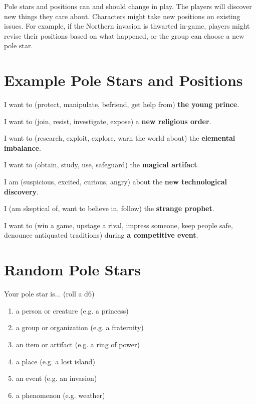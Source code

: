 \documentclass[10pt,oneside,letterpaper,landscape]{memoir}
\begin{document}
\begin{multicols}{3}
Pole stars and positions can and should change in play. The players will discover new things they care about. Characters might take new positions on existing issues. For example, if the Northern invasion is thwarted in-game, players might revise their positions based on what happened, or the group can choose a new pole star.

\vfill\null %

\columnbreak

\section{Example Pole Stars and Positions}

I want to (protect, manipulate, befriend, get help from) \textbf{the young prince}.

I want to (join, resist, investigate, expose) a \textbf{new religious order}.

I want to (research, exploit, explore, warn the world about) the \textbf{elemental imbalance}.

I want to (obtain, study, use, safeguard) the \textbf{magical artifact}.

I am (suspicious, excited, curious, angry) about the \textbf{new technological discovery}.

I (am skeptical of, want to believe in, follow) the \textbf{strange prophet}.

I want to (win a game, upstage a rival, impress someone, keep people safe, denounce antiquated traditions) during \textbf{a competitive event}.

\section{Random Pole Stars}

Your pole star is... (roll a d6)

\begin{enumerate}
\item [1:] a person or creature (e.g. a princess)
\item [2:] a group or organization (e.g. a fraternity)
\item [3:] an item or artifact (e.g. a ring of power)
\item [4:] a place (e.g. a lost island)
\item [5:] an event (e.g. an invasion)
\item [6:] a phenomenon (e.g. weather)
\end{enumerate}


\end{multicols}
\end{document}
